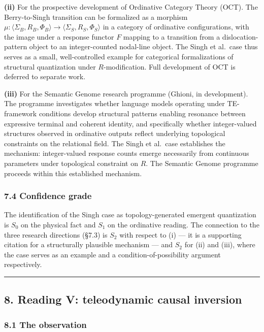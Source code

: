\documentclass[
  11pt,
  a4paper,
]{article}
\begin{document}
\textbf{(ii)} For the prospective development of Ordinative Category
Theory (OCT). The Berry-to-Singh transition can be formalized as a
morphism
\(\mu: \langle \Sigma_B, R_B, \Phi_B \rangle \to \langle \Sigma_S, R_S, \Phi_S \rangle\)
in a category of ordinative configurations, with the image under a
response functor \(F\) mapping to a transition from a
dislocation-pattern object to an integer-counted nodal-line object. The
Singh et al.~case thus serves as a small, well-controlled example for
categorical formalizations of structural quantization under
\(R\)-modification. Full development of OCT is deferred to separate
work.

\textbf{(iii)} For the Semantic Genome research programme (Ghioni, in
development). The programme investigates whether language models
operating under TE-framework conditions develop structural patterns
enabling resonance between expressive terminal and coherent identity,
and specifically whether integer-valued structures observed in
ordinative outputs reflect underlying topological constraints on the
relational field. The Singh et al.~case establishes the mechanism:
integer-valued response counts emerge necessarily from continuous
parameters under topological constraint on \(R\). The Semantic Genome
programme proceeds within this established mechanism.

\subsubsection{7.4 Confidence grade}\label{confidence-grade-3}

The identification of the Singh case as topology-generated emergent
quantization is \(S_0\) on the physical fact and \(S_1\) on the
ordinative reading. The connection to the three research directions
(§7.3) is \(S_2\) with respect to (i) --- it is a supporting citation
for a structurally plausible mechanism --- and \(S_2\) for (ii) and
(iii), where the case serves as an example and a
condition-of-possibility argument respectively.

\begin{center}\rule{0.5\linewidth}{0.5pt}\end{center}

\subsection{8. Reading V: teleodynamic causal
inversion}\label{reading-v-teleodynamic-causal-inversion}

\subsubsection{8.1 The observation}\label{the-observation}
\end{document}

